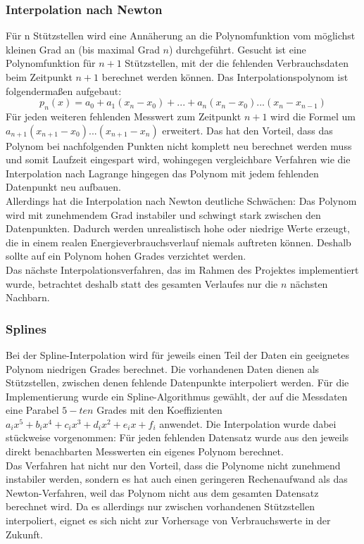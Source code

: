 \subsubsection{Interpolation nach Newton}
Für n Stützstellen wird eine Annäherung an die Polynomfunktion vom möglichst kleinen Grad an (bis maximal Grad $n$) durchgeführt. Gesucht ist eine Polynomfunktion für $n+1$ Stützstellen, mit der die fehlenden Verbrauchsdaten beim Zeitpunkt $n+1$ berechnet werden können. Das Interpolationspolynom ist folgendermaßen aufgebaut:
$$p_n(x)=a_0+a_1(x_n-x_0)+...+a_n(x_n-x_0)...(x_n-x_{n-1})$$
Für jeden weiteren fehlenden Messwert zum Zeitpunkt $n+1$ wird die Formel um $a_{n+1}(x_{n+1}-x_{0})...(x_{n+1}-x_{n})$ erweitert. Das hat den Vorteil, dass das Polynom bei nachfolgenden Punkten nicht komplett neu berechnet werden muss und somit Laufzeit eingespart wird, wohingegen vergleichbare Verfahren wie die Interpolation nach Lagrange hingegen das Polynom mit jedem fehlenden Datenpunkt neu aufbauen.\\
Allerdings hat die Interpolation nach Newton deutliche Schwächen: Das Polynom wird mit zunehmendem Grad instabiler und schwingt stark zwischen den Datenpunkten. Dadurch werden unrealistisch hohe oder niedrige Werte erzeugt, die in einem realen Energieverbrauchsverlauf niemals auftreten können. Deshalb sollte auf ein Polynom hohen Grades verzichtet werden.\\
Das nächste Interpolationsverfahren, das im Rahmen des Projektes implementiert wurde, betrachtet deshalb statt des gesamten Verlaufes nur die $n$ nächsten Nachbarn.

\subsubsection{Splines}
Bei der Spline-Interpolation wird für jeweils einen Teil der Daten ein geeignetes Polynom niedrigen Grades berechnet. Die vorhandenen Daten dienen als Stützstellen, zwischen denen fehlende Datenpunkte interpoliert werden. Für die Implementierung wurde ein Spline-Algorithmus gewählt, der auf die Messdaten eine Parabel $5-ten$ Grades mit den Koeffizienten $a_{i}x^5 + b_{i}x^4 + c_{i}x^3 + d_{i}x^2 + e_{i}x + f_{i}$ anwendet. Die Interpolation wurde dabei stückweise vorgenommen: Für jeden fehlenden Datensatz wurde aus den jeweils direkt benachbarten Messwerten ein eigenes Polynom berechnet.\\
Das Verfahren hat nicht nur den Vorteil, dass die Polynome nicht zunehmend instabiler werden, sondern es hat auch einen geringeren Rechenaufwand als das Newton-Verfahren, weil das Polynom nicht aus dem gesamten Datensatz berechnet wird. Da es allerdings nur zwischen vorhandenen Stützstellen interpoliert, eignet es sich nicht zur Vorhersage von Verbrauchswerte in der Zukunft.


